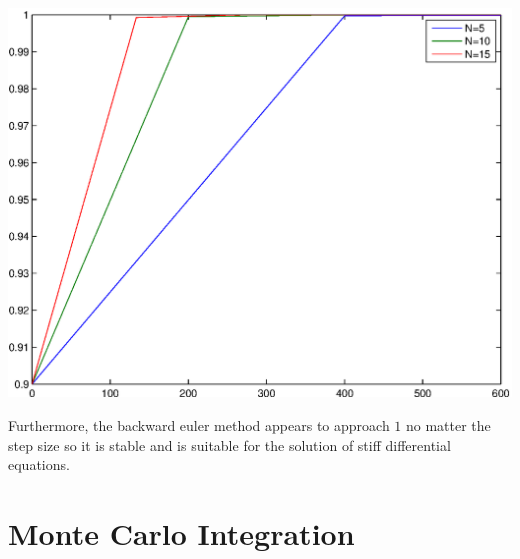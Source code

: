 \documentclass[paper=a4, fontsize=11pt]{scrartcl} %
\numberwithin{equation}{section} %
\numberwithin{figure}{section} %
\numberwithin{table}{section} %
\begin{document}
\begin{enumerate}
\begin{enumerate}
\includegraphics [scale=0.8] {test1.eps}

Furthermore, the backward euler method appears to approach $1$ no matter the step size so it is stable and is suitable for the solution of stiff differential equations.  

\end{enumerate}

\end{enumerate}



\section{Monte Carlo Integration}
\end{document}
